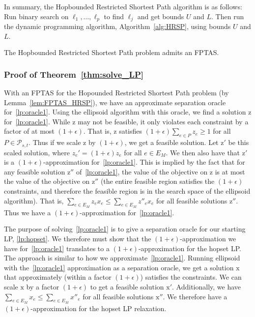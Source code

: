 In summary, the Hopbounded Restricted Shortest Path algorithm is as follows: Run binary search on $\ell_1, \dots, \ell_p$ to find $\ell_j$ and get bounds $U$ and $L$. Then run the dynamic programming algorithm, Algorithm~\ref{alg:HRSP}, using bounds $U$ and $L$.
\else \fi

\begin{lemma} \label{lem:FPTAS_HRSP}
    The Hopbounded Restricted Shortest Path problem admits an FPTAS.
\end{lemma}

\subsubsection{Proof of Theorem~\ref{thm:solve_LP}}
With an FPTAS for the Hopounded Restricted Shortest Path problem (by Lemma~\ref{lem:FPTAS_HRSP}), we have an approximate separation oracle for~\ref{lp:oracle1}. Using the ellipsoid algorithm with this oracle, we find a solution $\bm{\mathrm{z}}$ for~\ref{lp:oracle1}. While $\bm{\mathrm{z}}$ may not be feasible, it only violates each constraint by a factor of at most $(1+\epsilon)$. That is, $\bm{\mathrm{z}}$ satisfies $(1+\epsilon) \sum_{e \in P}  z_e \geq 1$ for all $P \in \mathcal{P}_{s,t}$. Thus if we scale $\bm{\mathrm{z}}$ by $(1+\epsilon)$, we get a feasible solution. Let $\bm{\mathrm{z'}}$ be this scaled solution, where $z_e' = (1+\epsilon) z_e$ for all $e \in E_M$. We then also have that $\bm{\mathrm{z'}}$ is a $(1+\epsilon)$-approximation for~\ref{lp:oracle1}. This is implied by the fact that for any feasible solution $\bm{\mathrm{z''}}$ of~\ref{lp:oracle1}, the value of the objective on $\bm{\mathrm{z}}$ is at most the value of the objective on $\bm{\mathrm{z''}}$ (the entire feasible region satisfies the $(1+\epsilon)$  constraints, and therefore the feasible region is in the search space of the ellipsoid algorithm). That is, $\sum_{e \in E_M}  z_e x_e \leq \sum_{e \in E_M}  z''_e x_e$ for all feasible solutions $\bm{\mathrm{z''}}$.  Thus we have a $(1+\epsilon)$-approximation for~\ref{lp:oracle1}.

The purpose of solving~\ref{lp:oracle1} is to give a separation oracle for our starting LP, \ref{lp:hopset}. We therefore must show that the $(1+\epsilon)$-approximation we have for~\ref{lp:oracle1} translates to a $(1+\epsilon)$-approximation for the hopset LP. The approach is similar to how we approximate~\ref{lp:oracle1}. Running ellipsoid with the~\ref{lp:oracle1} approximation as a separation oracle, we get a solution $\bm{\mathrm{x}}$ that approximately (within a factor $(1+\epsilon)$) satisfies the constraints. We can scale $\bm{\mathrm{x}}$ by a factor $(1+\epsilon)$ to get a feasible solution $\bm{\mathrm{x'}}$. Additionally, we have $\sum_{e \in E_M} x_e \leq \sum_{e \in E_M} x''_e$ for all feasible solutions $\bm{\mathrm{x''}}$. We therefore have a $(1+\epsilon)$-approximation for the hopset LP relaxation. 


